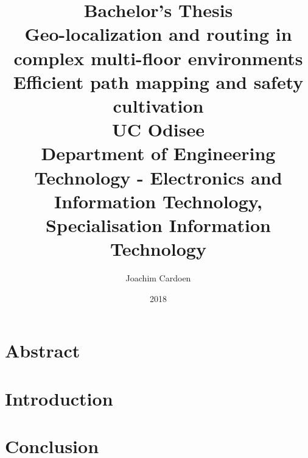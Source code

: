 \documentclass[twoside,12pt]{report}
\title{
    {\large Bachelor's Thesis}\\
    {Geo-localization and routing in complex multi-floor environments}\\
    {Efficient path mapping and safety cultivation}\\
    {\large UC Odisee}\\
    {\large Department of Engineering Technology - Electronics and Information Technology, Specialisation Information Technology}
}
\author{Joachim Cardoen}
\date{2018}
\begin{document}
\maketitle

\chapter*{Abstract}


\tableofcontents

\chapter{Introduction}


\chapter{Conclusion}


\appendix
\chapter{}


\newpage
{}
\end{document}
